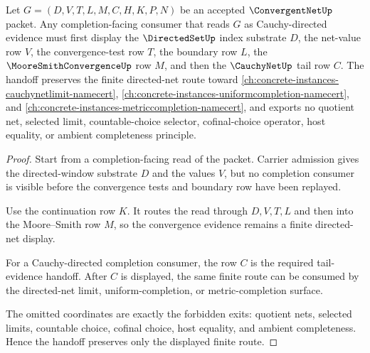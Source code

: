 \begin{theorem}
\label{thm:convergent-net-cauchy-handoff}
Let $G=(D,V,T,L,M,C,H,K,P,N)$ be an accepted $\ConvergentNetUp$ packet. Any completion-facing consumer that reads $G$ as Cauchy-directed evidence must first display the $\DirectedSetUp$ index substrate $D$, the net-value row $V$, the convergence-test row $T$, the boundary row $L$, the $\MooreSmithConvergenceUp$ row $M$, and then the $\CauchyNetUp$ tail row $C$. The handoff preserves the finite directed-net route toward \autoref{ch:concrete-instances-cauchynetlimit-namecert}, \autoref{ch:concrete-instances-uniformcompletion-namecert}, and \autoref{ch:concrete-instances-metriccompletion-namecert}, and exports no quotient net, selected limit, countable-choice selector, cofinal-choice operator, host equality, or ambient completeness principle.
\end{theorem}
\begin{proof}
Start from a completion-facing read of the packet. Carrier admission gives the directed-window substrate $D$ and the values $V$, but no completion consumer is visible before the convergence tests and boundary row have been replayed.

Use the continuation row $K$. It routes the read through $D,V,T,L$ and then into the Moore--Smith row $M$, so the convergence evidence remains a finite directed-net display.

For a Cauchy-directed completion consumer, the row $C$ is the required tail-evidence handoff. After $C$ is displayed, the same finite route can be consumed by the directed-net limit, uniform-completion, or metric-completion surface.

The omitted coordinates are exactly the forbidden exits: quotient nets, selected limits, countable choice, cofinal choice, host equality, and ambient completeness. Hence the handoff preserves only the displayed finite route.
\end{proof}

